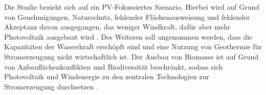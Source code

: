 %		
		
		Die Studie bezieht sich auf ein PV-Fokussiertes Szenario. 
		Hierbei wird auf Grund von Genehmigungen, Naturschutz, fehlender Flächenausweisung und fehlender Akzeptanz davon ausgegangen, das weniger Windkraft, dafür aber mehr Photovoltaik ausgebaut wird \cite[S.4]{ESRa_Fraunhofer}.
		Des Weiteren soll angenommen werden, dass die Kapazitäten der Wasserkraft erschöpft sind und eine Nutzung von Geothermie für Stromerzeugung nicht wirtschaftlich ist. 
		Der Ausbau von Biomasse ist auf Grund von Anbauflächenkonflikten und Biodiversität beschränkt, sodass sich Photovoltaik und Windenergie zu den zentralen Technologien zur Stromerzeugung durchsetzen \cite[S.6]{ESRa_Fraunhofer}. \\
		
